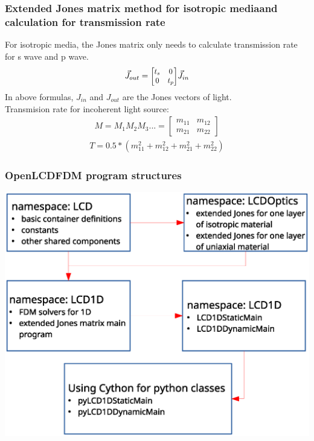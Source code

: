 \documentclass{beamer}
\newcommand\scalemath[2]{\scalebox{#1}{\mbox{\ensuremath{\displaystyle #2}}}} %
\begin{document}
\begin{frame}
\frametitle{Extended Jones matrix method for isotropic mediaand calculation for transmission rate}
For isotropic media, the Jones matrix only needs to calculate transmission rate for s wave and p wave.
\begin{eqnarray}
\vec{J}_{out} = 
\scalemath{0.9}{
\begin{bmatrix}
{t}_s & 0 \\ 0 & {t}_p
\end{bmatrix}
}
\vec{J}_{in} \nonumber
\nonumber
\label{eq:extendedJones_iso}
\end{eqnarray}
In above formulas, $J_{in}$ and $J_{out}$ are the Jones vectors of light.\\
Transmision rate for incoherent light source:
\begin{eqnarray}
M = M_1M_2M_3... = 
\begin{bmatrix}
m_{11} & m_{12} \\ m_{21} & m_{22}
\end{bmatrix}
\nonumber
\end{eqnarray}
\begin{eqnarray}
T = 0.5*(m_{11}^2 + m_{12}^2 + m_{21}^2 + m_{22}^2) \nonumber
\end{eqnarray}
\end{frame}
\begin{frame}
\frametitle{OpenLCDFDM program structures}
\begin{center}
\includegraphics[scale=0.4]{openlcdfdm_structure.eps}
\end{center}
\end{frame}
\end{document}
